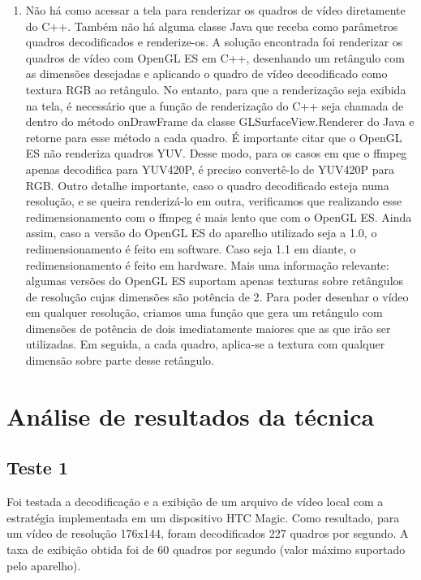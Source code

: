 \documentclass{acm_proc_article-sp}
\begin{document}
\begin{enumerate}
 \item Não há como acessar a tela para renderizar os quadros de vídeo diretamente do C++. Também não há alguma classe Java que receba como parâmetros quadros decodificados e renderize-os. A solução encontrada foi renderizar os quadros de vídeo com OpenGL ES \cite{opengl} em C++, desenhando um retângulo com as dimensões desejadas e aplicando o quadro de vídeo decodificado como textura RGB ao retângulo. No entanto, para que a renderização seja exibida na tela, é necessário que a função de renderização do C++ seja chamada de dentro do método onDrawFrame da classe GLSurfaceView.Renderer do Java e retorne para esse método a cada quadro. É importante citar que o OpenGL ES não renderiza quadros YUV. Desse modo, para os casos em que o ffmpeg apenas decodifica para YUV420P, é preciso convertê-lo de YUV420P para RGB. Outro detalhe importante, caso o quadro decodificado esteja numa resolução, e se queira renderizá-lo em outra, verificamos que realizando esse redimensionamento com o ffmpeg é mais lento que com o OpenGL ES. Ainda assim, caso a versão do OpenGL ES do aparelho utilizado seja a 1.0, o redimensionamento é feito em software. Caso seja 1.1 em diante, o redimensionamento é feito em hardware. Mais uma informação relevante: algumas versões do OpenGL ES suportam apenas texturas sobre retângulos de resolução cujas dimensões são potência de 2. Para poder desenhar o vídeo em qualquer resolução, criamos uma função que gera um retângulo com dimensões de potência de dois imediatamente maiores que as que irão ser utilizadas. Em seguida, a cada quadro, aplica-se a textura com qualquer dimensão sobre parte desse retângulo.
\end{enumerate}

\section{Análise de resultados da técnica}
\subsection{Teste 1}
Foi testada a decodificação e a exibição de um arquivo de vídeo local com a estratégia implementada em um dispositivo HTC Magic. Como resultado, para um vídeo de resolução 176x144, foram decodificados 227 quadros por segundo. A taxa de exibição obtida foi de 60 quadros por segundo (valor máximo suportado pelo aparelho).
\end{document}
